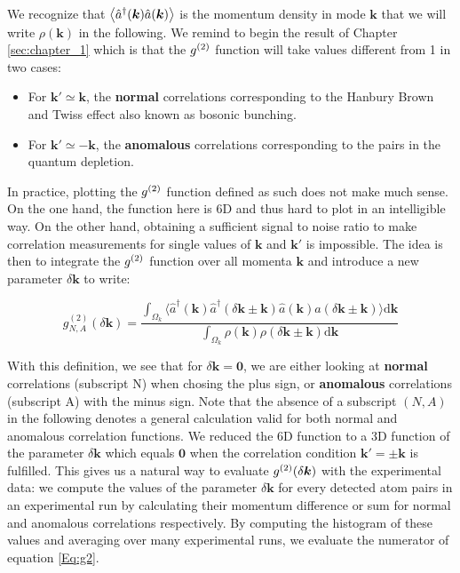 \noindent We recognize that $\left\langle\hat{a}^{\dagger}(\bm{k}) \hat{a}(\bm{k})\right\rangle$ is the momentum density in mode $\bm{k}$ that we will write $\rho(\bm{k})$ in the following. We remind to begin the result of Chapter \ref{sec:chapter_1} which is that the $g^{(2)}$ function will take values different from 1 in two cases:

\begin{itemize}
    \item For $\bm{k'} \simeq \bm{k}$, the \textbf{normal} correlations corresponding to the Hanbury Brown and Twiss effect also known as bosonic bunching.
    \item For $\bm{k'} \simeq -\bm{k}$, the \textbf{anomalous} correlations corresponding to the \kmk pairs in the quantum depletion.
\end{itemize}

In practice, plotting the $g^{(2)}$ function defined as such does not make much sense. On the one hand, the function here is 6D and thus hard to plot in an intelligible way. On the other hand, obtaining a sufficient signal to noise ratio to make correlation measurements for single values of $\bm{k}$ and $\bm{k'}$ is impossible. The idea is then to integrate the $g^{(2)}$ function over all momenta $\bm{k}$ and introduce a new parameter $\delta \bm{k}$ to write:

\begin{equation}
    g_{N,A}^{(2)} (\delta {\bm k})=\frac{\int_{\Omega_{k}} \langle \hat{a}^{\dagger}({\bm k}) \hat{a}^{\dagger}(\delta {\bm k} \pm {\bm k}) \hat{a}({\bm k}) \hat{a}(\delta {\bm k} \pm {\bm k}) \rangle \mathrm{d}{\bm k}}{\int_{\Omega_{k}} \rho({\bm k}) \rho(\delta {\bm k} \pm {\bm k}) \mathrm{d}\bm{k}}
    \label{Eq:g2}
\end{equation}

\noindent With this definition, we see that for $\delta \bm{k}=\bm{0}$, we are either looking at \textbf{normal} \kk correlations (subscript N) when chosing the plus sign, or \textbf{anomalous} \kmk correlations (subscript A) with the minus sign. Note that the absence of a subscript $(N,A)$ in the following denotes a general calculation valid for both normal and anomalous correlation functions. We reduced the 6D function to a 3D function of the parameter $\delta \bm{k}$ which equals $\bm{0}$ when the correlation condition $\bm{k'} = \pm \bm{k}$ is fulfilled. This gives us a natural way to evaluate $g^{(2)} (\delta \bm{k})$ with the experimental data: we compute the values of the parameter $\delta \bm{k}$ for every detected atom pairs in an experimental run by calculating their momentum difference or sum for normal and anomalous correlations respectively. By computing the histogram of these values and averaging over many experimental runs, we evaluate the numerator of equation \ref{Eq:g2}.

